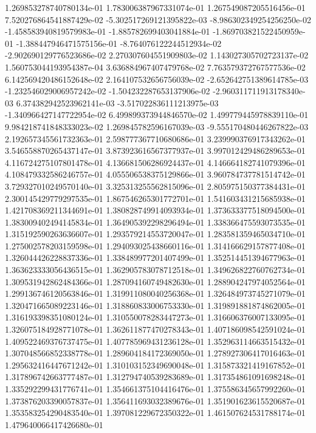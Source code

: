 1.269853278740780134e-01
1.783006387967331074e-01
1.267549087205516456e-01
7.520276864541887429e-02
-5.302517269121395822e-03
-8.986302349254256250e-02
-1.458583940819579983e-01
-1.885782699403041884e-01
-1.869703821522450959e-01
-1.388447946471575156e-01
-8.764076122244512934e-02
-2.902690129776523686e-02
2.270307604551909803e-02
1.143027305702723137e-02
1.560753044193954387e-04
3.636884967407479768e-02
7.763579372767577536e-02
6.142569420486152648e-02
2.164107532656756039e-02
-2.652642751389614785e-03
-1.232546029006957242e-02
-1.504232287653137906e-02
-2.960311711913178340e-03
6.374382942523962141e-03
-3.517022836111213975e-03
-1.340966427147722954e-02
6.499899373944846570e-02
1.499779445978839110e-01
9.984218741848333023e-02
1.269845782596167039e-03
-9.555170480446267822e-03
2.192657345561732363e-01
2.598777367710680686e-01
3.239990376917343262e-01
3.546558870265437147e-01
3.873923616567377937e-01
3.997012429486289653e-01
4.116724275107801478e-01
4.136681506286924437e-01
4.146664182741079396e-01
4.108479332586246757e-01
4.055506538375129866e-01
3.960784737781514742e-01
3.729327010249570140e-01
3.325313255562815096e-01
2.805975150377384431e-01
2.300145429779297535e-01
1.867546265301772701e-01
1.541603431215685938e-01
1.421708369211344691e-01
1.380828749914093934e-01
1.373633377518094500e-01
1.383009402494145834e-01
1.364905392298296494e-01
1.338366475593073535e-01
1.315192590263636607e-01
1.293579214553720047e-01
1.283581359465034710e-01
1.275002578203159598e-01
1.294093025438660116e-01
1.314166629157877408e-01
1.326044426228837336e-01
1.338489977201407499e-01
1.352514451394677963e-01
1.363623333056436515e-01
1.362905783078712518e-01
1.349626822760762734e-01
1.309531942862484366e-01
1.287094160749482630e-01
1.288904247974052564e-01
1.299136746120563846e-01
1.319911080040256368e-01
1.326484973745271079e-01
1.320471665089223146e-01
1.318860833006753330e-01
1.319891881874862005e-01
1.316193398351080124e-01
1.310550078283447273e-01
1.316606376007133095e-01
1.326075184928771078e-01
1.362611877470278343e-01
1.407186098542591024e-01
1.409522469376737475e-01
1.407785969431236128e-01
1.352963114663515432e-01
1.307048566852338778e-01
1.289604184172369050e-01
1.278927306417016463e-01
1.295632416447671242e-01
1.310103152349690048e-01
1.315873321419167852e-01
1.317896742663777487e-01
1.312794740539283689e-01
1.317354861091698248e-01
1.335292299431776741e-01
1.354661375104416476e-01
1.375586345657992260e-01
1.373876203390057837e-01
1.356411693032389676e-01
1.351901623615520687e-01
1.353583254290483540e-01
1.397081229672350322e-01
1.461507624531788174e-01
1.479640066417426680e-01
